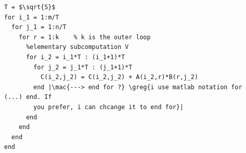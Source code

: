 \documentclass[sigplan,review,anonymous]{acmart}\settopmatter{printfolios=true,printccs=false,printacmref=false}
\newcommand\greg[1]{\textcolor{blue}{[Greg: #1]}}
\newcommand\mac[1]{\textcolor{red}{[Mac: #1]}}
\begin{document}
\begin{lstlisting}[float=h, caption=Pseudocode of I/O optimal sequential MMM, 
label=lst:pseudocode]
T = $\sqrt{S}$
for i_1 = 1:m/T
  for j_1 = 1:n/T
    for r = 1:k    % k is the outer loop
      %elementary subcomputation V
      for i_2 = i_1*T : (i_1+1)*T
        for j_2 = j_1*T : (j_1+1)*T
          C(i_2,j_2) = C(i_2,j_2) + A(i_2,r)*B(r,j_2)
        end |\mac{---> end for ?} \greg{i use matlab notation for (...) end. If 
        you prefer, i can chcange it to end for}|
      end
    end
  end
end
 \end{lstlisting}
%
 
%
%
%
%
\end{document}
